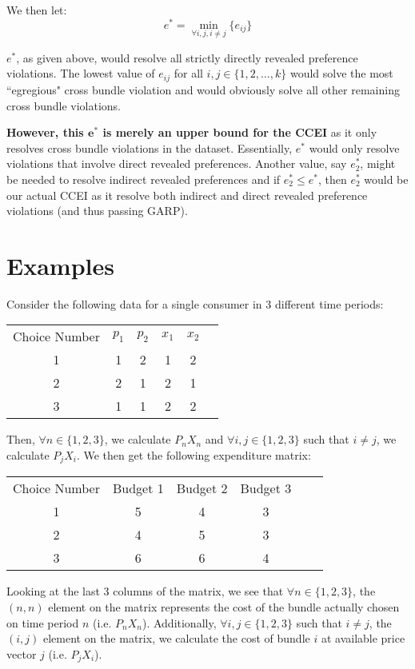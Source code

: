 \documentclass{article} %
\begin{document}
We then let:
$$e^{*}=\min_{\forall i,j, i\not=j}\{e_{ij}\}$$

$e^{*}$, as given above, would resolve all strictly directly revealed preference violations. The lowest value of $e_{ij}$ for all $i,j\in\{1,2,\ldots,k\}$ would solve the most ``egregious" cross bundle violation and would obviously solve all other remaining cross bundle violations.


\textbf{However, this $\mathbf{e^*}$ is merely an upper bound for the CCEI} as it only resolves cross bundle violations in the dataset. Essentially, $e^*$ would only resolve violations that involve direct revealed preferences. Another value, say $e^*_{2}$, might be needed to resolve indirect revealed preferences and if $e^*_{2}\leq e^*$, then $e^*_{2}$ would be our actual CCEI as it resolve both indirect and direct revealed preference violations (and thus passing GARP). 

\section{Examples}

Consider the following data for a single consumer in 3 different time periods:

\begin{center}
\begin{tabular}{ cccccc } 
Choice Number & $p_{1}$ & $p_{2}$ & $x_{1}$ & $x_{2}$ \\
1&1&2&1&2 \\
2&2&1&2&1 \\
3&1&1&2&2
\end{tabular}
\end{center}

Then, $\forall n\in\{1,2,3\}$, we calculate $P_{n}X_{n}$ and $\forall i,j\in\{1,2,3\}$ such that $i\not=j$, we calculate $P_{j}X_{i}$. We then get the following expenditure matrix:

\begin{center}
\begin{tabular}{ cccccc } 
Choice Number & Budget 1 & Budget 2 & Budget 3 \\
1&5&4&3 \\
2&4&5&3 \\
3&6&6&4
\end{tabular}
\end{center}

Looking at the last 3 columns of the matrix, we see that $\forall n\in\{1,2,3\}$, the $(n,n)$ element on the matrix represents the cost of the bundle actually chosen on time period $n$ (i.e. $P_{n}X_{n}$). Additionally, $\forall i,j\in\{1,2,3\}$ such that $i\not=j$, the $(i,j)$ element on the matrix, we calculate the cost of bundle $i$ at available price vector $j$ (i.e. $P_{j}X_{i}$).
\bigskip
\end{document}

